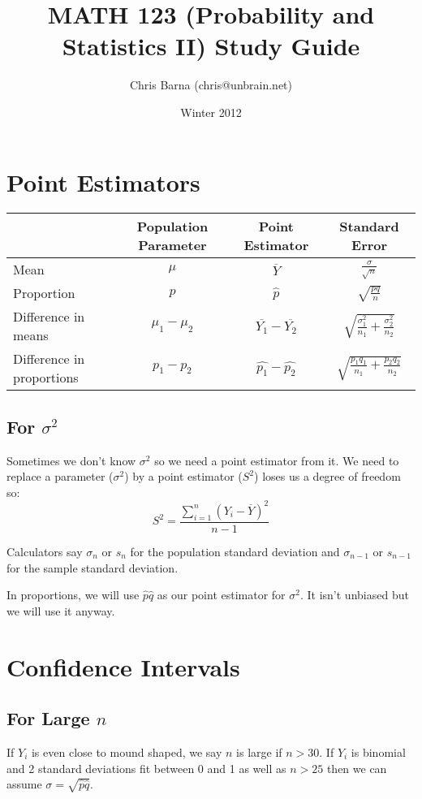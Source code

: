 \documentclass{article}
\begin{document}
\title{MATH 123 (Probability and Statistics II) Study Guide}
\author{Chris Barna (chris@unbrain.net)}
\date{Winter 2012}

\maketitle

\section{Point Estimators}
\begin{tabular}{ | l | c | c | c| }
  \hline
  & \textbf{Population Parameter} & \textbf{Point Estimator} &
    \textbf{Standard Error} \\
  \hline \hline
  Mean & $\mu$ & $\overline{Y}$ & $\frac{\sigma}{\sqrt{n}}$ \\ \hline
  Proportion & $p$ & $\hat{p}$ & $\sqrt{\frac{pq}{n}}$ \\ \hline
  Difference in means & $\mu_1 - \mu_2$ & $\overline{Y_1} - \overline{Y_2}$
    & $\sqrt{\frac{\sigma^2_1}{n_1}+ \frac{\sigma^2_2}{n_2}}$ \\ \hline
  Difference in proportions & $p_1 - p_2$ & $\hat{p_1} - \hat{p_2}$
    & $\sqrt{\frac{p_1q_1}{n_1} + \frac{p_2q_2}{n_2}}$ \\ \hline
\end{tabular}

\subsection{For $\sigma^2$}
Sometimes we don't know $\sigma^2$ so we need a point estimator from it. We
need to replace a parameter ($\sigma^2$) by a point estimator ($S^2$) loses us
a degree of freedom so:
\begin{equation}
  S^2 = \frac{\sum_{i=1}^n (Y_i - \overline{Y})^2}{n-1}
\end{equation}

Calculators say $\sigma_n$ or $s_n$ for the population standard deviation and
$\sigma_{n-1}$ or $s_{n-1}$ for the sample standard deviation.

In proportions, we will use $\hat{p}\hat{q}$ as our point estimator for
$\sigma^2$. It isn't unbiased but we will use it anyway.


\section{Confidence Intervals}
\subsection{For Large $n$}
If $Y_i$ is even close to mound shaped, we say $n$ is large if $n > 30$. If
$Y_i$ is binomial and 2 standard deviations fit between 0 and 1 as well as
$n > 25$ then we can assume $\sigma = \sqrt{\hat{p}\hat{q}}$.
\end{document}
